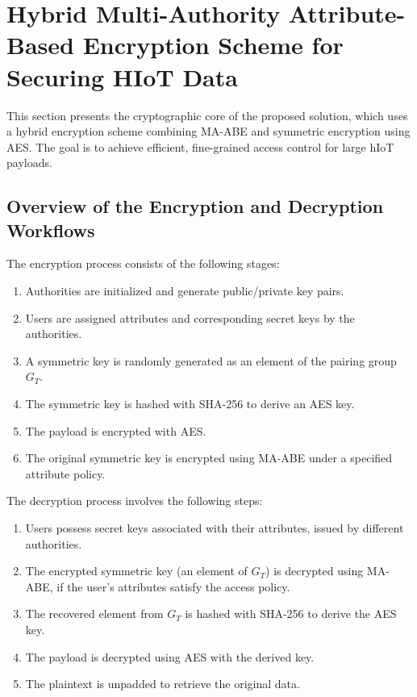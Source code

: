 \documentclass[cic,tc,english]{iiufrgs}
\begin{document}
    \section{Hybrid Multi-Authority Attribute-Based Encryption Scheme for Securing HIoT Data}
    \label{sec:encryption}

        This section presents the cryptographic core of the proposed solution, which uses a hybrid encryption scheme combining MA-ABE and symmetric encryption using AES. The goal is to achieve efficient, fine-grained access control for large hIoT payloads.

        \subsection{Overview of the Encryption and Decryption Workflows}
            The encryption process consists of the following stages:
            \begin{enumerate}
                \item Authorities are initialized and generate public/private key pairs.
                \item Users are assigned attributes and corresponding secret keys by the authorities.
                \item A symmetric key is randomly generated as an element of the pairing group $G_T$.
                \item The symmetric key is hashed with SHA-256 to derive an AES key.
                \item The payload is encrypted with AES.
                \item The original symmetric key is encrypted using MA-ABE under a specified attribute policy.
            \end{enumerate}

            The decryption process involves the following steps:
            \begin{enumerate}
                \item Users possess secret keys associated with their attributes, issued by different authorities.
                \item The encrypted symmetric key (an element of $G_T$) is decrypted using MA-ABE, if the user's attributes satisfy the access policy.
                \item The recovered element from $G_T$ is hashed with SHA-256 to derive the AES key.
                \item The payload is decrypted using AES with the derived key.
                \item The plaintext is unpadded to retrieve the original data.
            \end{enumerate}
\end{document}
